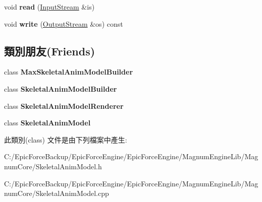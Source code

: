 \begin{DoxyCompactItemize}
\item 
void {\bfseries read} (\hyperlink{class_magnum_1_1_input_stream}{Input\+Stream} \&is)\hypertarget{class_magnum_1_1_skeletal_anim_model_1_1_node_a6aa16779ab19c730621222de632bdac2}{}\label{class_magnum_1_1_skeletal_anim_model_1_1_node_a6aa16779ab19c730621222de632bdac2}

\item 
void {\bfseries write} (\hyperlink{class_magnum_1_1_output_stream}{Output\+Stream} \&os) const \hypertarget{class_magnum_1_1_skeletal_anim_model_1_1_node_acb20d785bd449b3b3f5363f03ed5825f}{}\label{class_magnum_1_1_skeletal_anim_model_1_1_node_acb20d785bd449b3b3f5363f03ed5825f}

\end{DoxyCompactItemize}
\subsection*{類別朋友(Friends)}
\begin{DoxyCompactItemize}
\item 
class {\bfseries Max\+Skeletal\+Anim\+Model\+Builder}\hypertarget{class_magnum_1_1_skeletal_anim_model_1_1_node_a68b08defd5651552ef2b6f922eee7ff9}{}\label{class_magnum_1_1_skeletal_anim_model_1_1_node_a68b08defd5651552ef2b6f922eee7ff9}

\item 
class {\bfseries Skeletal\+Anim\+Model\+Builder}\hypertarget{class_magnum_1_1_skeletal_anim_model_1_1_node_a31d58261bc4fbf7a6c1d2d2547437974}{}\label{class_magnum_1_1_skeletal_anim_model_1_1_node_a31d58261bc4fbf7a6c1d2d2547437974}

\item 
class {\bfseries Skeletal\+Anim\+Model\+Renderer}\hypertarget{class_magnum_1_1_skeletal_anim_model_1_1_node_ae50fe2cd824b9de98af4dd4aa51d4935}{}\label{class_magnum_1_1_skeletal_anim_model_1_1_node_ae50fe2cd824b9de98af4dd4aa51d4935}

\item 
class {\bfseries Skeletal\+Anim\+Model}\hypertarget{class_magnum_1_1_skeletal_anim_model_1_1_node_a88c72f2f6b125ba518843b71080035e5}{}\label{class_magnum_1_1_skeletal_anim_model_1_1_node_a88c72f2f6b125ba518843b71080035e5}

\end{DoxyCompactItemize}


此類別(class) 文件是由下列檔案中產生\+:\begin{DoxyCompactItemize}
\item 
C\+:/\+Epic\+Force\+Backup/\+Epic\+Force\+Engine/\+Epic\+Force\+Engine/\+Magnum\+Engine\+Lib/\+Magnum\+Core/Skeletal\+Anim\+Model.\+h\item 
C\+:/\+Epic\+Force\+Backup/\+Epic\+Force\+Engine/\+Epic\+Force\+Engine/\+Magnum\+Engine\+Lib/\+Magnum\+Core/Skeletal\+Anim\+Model.\+cpp\end{DoxyCompactItemize}
